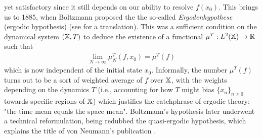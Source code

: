 \documentclass[11pt]{report}
\newcommand{\1}[1]{\mathbbm{1}_{\{#1\}}}
\theoremstyle{definition}
\begin{document}
    yet satisfactory since it still depends on our ability to resolve $f(x_0)$. This brings us to
    1885, when Boltzmann proposed the the so-called \textit{Ergodenhypothese}
    (ergodic hypothesis) \cite{Hasenöhrl_Boltzmann_2012} (see
    \cite{Boltzmann_2019} for a translation). This was a sufficient condition on
    the dynamical system $(\mathbb{X},T)$ to deduce the existence of a functional
    $\mu^T:L^2(\mathbb{X})\rightarrow\mathbb{R}$ such that
    \begin{align}
        \lim_{N\rightarrow\infty}\mu_N^T(f,x_0)=\mu^T(f)\label{eq2}
    \end{align}
    which is now independent of the initial state $x_0$. Informally, the number
    $\mu^T(f)$ turns out to be a sort of weighted average of $f$ over $\mathbb{X}$,
    with the weights depending on the dynamics $T$ (i.e., accounting for how $T$
    might bias $\{x_n\}_{n\geq 0}$ towards specific regions of $\mathbb{X}$) which
    justifies the catchphrase of ergodic theory: "the time mean equals the space
    mean". Boltzmann's hypothesis later underwent a technical reformulation,
    being redubbed the quasi-ergodic hypothesis, which explains the title of von
    Neumann's publication \cite{Neumann_1932}. 
\end{document}
